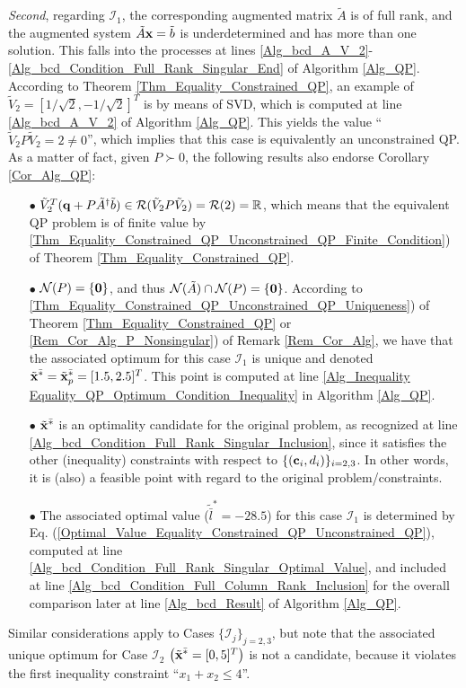\documentclass{imaman}
\newcommand{\bfc}{{\bf c}}
\newcommand{\bfx}{{\bf x}}
\newcommand{\bfq}{{\bf q}}
\newcommand{\bfzero}{{\bf 0}}
\newcommand{\real}{\mathbb{R}}
\newcommand{\calI}{{\mathcal I}}
\newcommand{\calN}{{\mathcal N}}
\newcommand{\calR}{{\mathcal R}}
\numberwithin{equation}{section}
\begin{document}
\begin{example}
\textit{Second}, regarding $\calI_1$, the corresponding augmented matrix $\tilde A$ is of full rank, and the augmented system $\tilde A\bfx=\tilde b$ is underdetermined and has more than one solution. This falls into the processes at lines \ref{Alg_bcd_A_V_2}-\ref{Alg_bcd_Condition_Full_Rank_Singular_End} of Algorithm \ref{Alg_QP}. According to Theorem \ref{Thm_Equality_Constrained_QP}, an example of $\tilde V_2=[1/\sqrt{2},-1/\sqrt{2}]^T$ is by means of SVD, which is computed at line \ref{Alg_bcd_A_V_2} of Algorithm \ref{Alg_QP}. This yields the value ``$\tilde V_2P\tilde V_2=2\ne 0$'', which implies that this case is equivalently an unconstrained QP. As a matter of fact, given $P\succ 0$, the following results also endorse Corollary \ref{Cor_Alg_QP}:
\begin{enumerate}
\item[$\bullet$] $\tilde V_2^T(\bfq+P\tilde A^\dagger\tilde b)\in\calR(\tilde V_2 P\tilde V_2)=\calR(2)=\real$, which means that the equivalent QP problem is of finite value by \ref{Thm_Equality_Constrained_QP_Unconstrained_QP_Finite_Condition}) of Theorem \ref{Thm_Equality_Constrained_QP}.
\item[$\bullet$] $\calN(P)=\{\bfzero\}$, and thus $\calN(\tilde A)\cap\calN(P)=\{\bfzero\}$. According to \ref{Thm_Equality_Constrained_QP_Unconstrained_QP_Uniqueness}) of Theorem \ref{Thm_Equality_Constrained_QP} or \ref{Rem_Cor_Alg_P_Nonsingular}) of Remark \ref{Rem_Cor_Alg}, we have that the associated optimum for this case $\calI_1$ is unique and denoted $\tilde\bfx^{\bar *}=\tilde\bfx_p^{\bar *}=[1.5,2.5]^T$. This point is computed at line \ref{Alg_Inequality Equality_QP_Optimum_Condition_Inequality} in Algorithm \ref{Alg_QP}.
\item[$\bullet$] $\tilde\bfx^{\bar *}$ is an optimality candidate for the original problem, as recognized at line \ref{Alg_bcd_Condition_Full_Rank_Singular_Inclusion}, since it satisfies the other (inequality) constraints with respect to $\{(\bfc_i,d_i)\}_{i=2,3}$. In other words, it is (also) a feasible point with regard to the original problem/constraints.
\item[$\bullet$] The associated optimal value ($\tilde{\bar l}^*=-28.5$) for this case $\calI_1$ is determined by Eq. (\ref{Optimal_Value_Equality_Constrained_QP_Unconstrained_QP}), computed at line \ref{Alg_bcd_Condition_Full_Rank_Singular_Optimal_Value}, and included at line \ref{Alg_bcd_Condition_Full_Column_Rank_Inclusion} for the overall comparison later at line \ref{Alg_bcd_Result} of Algorithm \ref{Alg_QP}.
\end{enumerate}
Similar considerations apply to Cases $\{\calI_j\}_{j=2,3}$, but note that the associated unique optimum for Case $\calI_2$ $\left(\tilde\bfx^{\bar *}=[0,5]^T\right)$ is not a candidate, because it violates the first inequality constraint ``$x_1+x_2\le 4$''.


\end{example}
\end{document}
